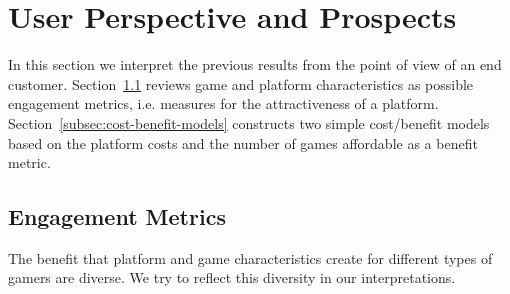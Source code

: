 \section{User Perspective and Prospects}
\label{sec:engagement}

In this section we interpret the previous results from the point of view of an end customer. Section~\ref{subsec:metrics} reviews game and platform characteristics as possible engagement metrics, i.e. measures for the attractiveness of a platform. Section~\ref{subsec:cost-benefit-models} constructs two simple cost/benefit models based on the platform costs and the number of games affordable as a benefit metric.


\subsection{Engagement Metrics}\label{subsec:metrics}

The benefit that platform and game characteristics create for different types of gamers are diverse. We try to reflect this diversity in our interpretations.



